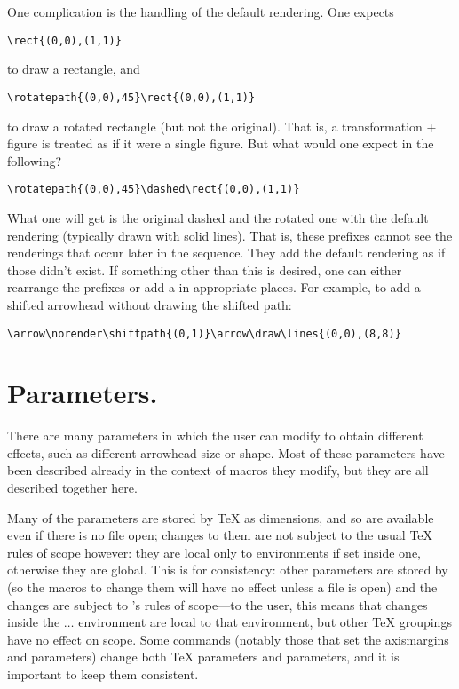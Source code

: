 \documentclass[letterpaper]{article}
\begin{document}
One complication is the handling of the default rendering. One expects
\begin{verbatim}
\rect{(0,0),(1,1)}
\end{verbatim}
to draw a rectangle, and
\begin{verbatim}
\rotatepath{(0,0),45}\rect{(0,0),(1,1)}
\end{verbatim}
to draw a rotated rectangle (but not the original). That is, a
transformation + figure is treated as if it were a single figure. But
what would one expect in the following?
\begin{verbatim}
\rotatepath{(0,0),45}\dashed\rect{(0,0),(1,1)}
\end{verbatim}
What one will get is the original dashed and the rotated one with the
default rendering (typically drawn with solid lines). That is, these
prefixes cannot see the renderings that occur later in the sequence.
They add the default rendering as if those didn't exist. If something
other than this is desired, one can either rearrange the prefixes or add
a \label{norenderexample} in appropriate
places. For example, to add a shifted arrowhead without drawing the
shifted path:
\begin{verbatim}
\arrow\norender\shiftpath{(0,1)}\arrow\draw\lines{(0,0),(8,8)}
\end{verbatim}


\section{Parameters.}\label{parameters}

There are many parameters in \mfp{} which the user can modify to
obtain different effects, such as different arrowhead size or shape.
Most of these parameters have been described already in the context of
macros they modify, but they are all described together here.

Many of the parameters are stored by \TeX{} as dimensions, and so are
available even if there is no \MF{} file open; changes to them are not
subject to the usual \TeX{} rules of scope however: they are local
only to  environments if set inside one, otherwise
they are global. This is for consistency: other parameters are stored by
\MF{} (so the macros to change them will have no effect unless a \MF{}
file is open) and the changes are subject to \MF{}'s rules of scope---to
the \mfp{} user, this means that changes inside the  $\ldots$
 environment are local to that environment, but other
\TeX{} groupings have no effect on scope. Some commands (notably those
that set the axismargins and  parameters) change both \TeX{}
parameters and \MF{} parameters, and it is important to keep them
consistent.
\end{document}
